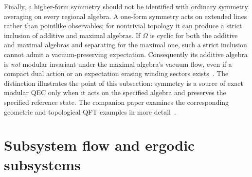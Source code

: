 \documentclass[a4paper,11pt]{article}
\theoremstyle{definition}
\begin{document}
Finally, a higher-form symmetry should not be identified with ordinary
symmetry averaging on every regional algebra. A one-form symmetry acts
on extended lines rather than pointlike observables; for nontrivial
topology it can produce a strict inclusion of additive and maximal
algebras. If $\Omega$ is cyclic for both the additive and maximal algebras and separating
for the maximal one, such a strict inclusion cannot admit a
vacuum-preserving expectation. Consequently its additive algebra is
\emph{not} modular invariant under the maximal algebra's vacuum flow,
even if a compact dual action or an expectation erasing winding sectors
exists~\cite{GaiottoKapustinSeibergWillett2015,CasiniHuertaMaganPontello2021}.
The distinction illustrates the point of this subsection: symmetry is a
source of exact modular QEC only when it acts on the specified algebra
and preserves the specified reference state. The companion paper
examines the corresponding geometric and topological QFT examples in
more detail~\cite{companionQFT}.

\section{Subsystem flow and ergodic subsystems}\label{sec:ergodic}
\end{document}
